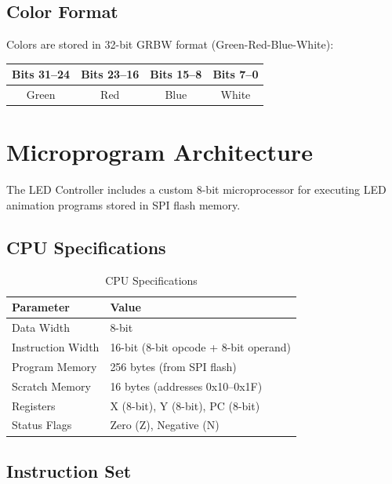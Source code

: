 \documentclass[11pt,a4paper]{article}
\begin{document}
\subsection{Color Format}

Colors are stored in 32-bit GRBW format (Green-Red-Blue-White):

\begin{center}
\begin{tabular}{|c|c|c|c|}
\hline
\textbf{Bits 31--24} & \textbf{Bits 23--16} & \textbf{Bits 15--8} & \textbf{Bits 7--0} \\
\hline
Green & Red & Blue & White \\
\hline
\end{tabular}
\end{center}

\section{Microprogram Architecture}

The LED Controller includes a custom 8-bit microprocessor for executing LED animation programs stored in SPI flash memory.

\subsection{CPU Specifications}

\begin{table}[H]
\centering
\caption{CPU Specifications}
\begin{tabular}{@{}ll@{}}
\toprule
\textbf{Parameter} & \textbf{Value} \\
\midrule
Data Width & 8-bit \\
Instruction Width & 16-bit (8-bit opcode + 8-bit operand) \\
Program Memory & 256 bytes (from SPI flash) \\
Scratch Memory & 16 bytes (addresses 0x10--0x1F) \\
Registers & X (8-bit), Y (8-bit), PC (8-bit) \\
Status Flags & Zero (Z), Negative (N) \\
\bottomrule
\end{tabular}
\end{table}

\subsection{Instruction Set}
\end{document}
